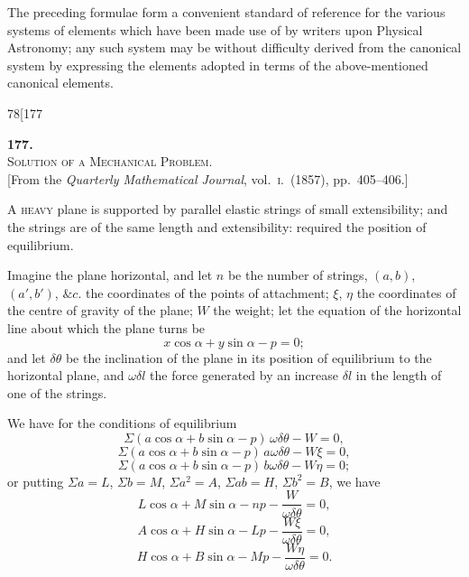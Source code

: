 \documentclass[11pt]{article}
\begin{document}
The preceding formulae form a convenient standard of reference for the various
systems of elements which have been made use of by writers upon Physical Astronomy;
any such system may be without difficulty derived from the canonical system by
expressing the elements adopted in terms of the above-mentioned canonical elements.

\newpage

\begin{center}
\small\textsc{78}\hfill\hfill[177
\end{center}

\vspace{4em}

\begin{center}
{\large\textbf{177.}}\\[1em]
{\large\scshape Solution of a Mechanical Problem.}\\[1em]
{\small [From the \textit{Quarterly Mathematical Journal}, vol.~\textsc{i}.\ (1857), pp.~405--406.]}
\end{center}

\bigskip

\textsc{A heavy} plane is supported by parallel elastic strings of small extensibility;
and the strings are of the same length and extensibility: required the position of
equilibrium.

Imagine the plane horizontal, and let $n$ be the number of strings, $(a, b)$, $(a', b')$,
$\&c.$ the coordinates of the points of attachment; $\xi$, $\eta$ the coordinates of the centre
of gravity of the plane; $W$ the weight; let the equation of the horizontal line about
which the plane turns be
\[
x\cos\alpha + y\sin\alpha - p = 0;
\]
and let $\delta\theta$ be the inclination of the plane in its position of equilibrium to the hori\-zontal plane, and $\omega\delta l$ the force generated by an increase $\delta l$ in the length of one of
the strings.

We have for the conditions of equilibrium
\[
\Sigma(a\cos\alpha + b\sin\alpha - p)\,\omega\delta\theta - W = 0,
\]
\[
\Sigma(a\cos\alpha + b\sin\alpha - p)\,a\omega\delta\theta - W\xi = 0,
\]
\[
\Sigma(a\cos\alpha + b\sin\alpha - p)\,b\omega\delta\theta - W\eta = 0;
\]
or putting $\Sigma a = L$, $\Sigma b = M$, $\Sigma a^{2} = A$, $\Sigma ab = H$, $\Sigma b^{2} = B$, we have
\[
L\cos\alpha + M\sin\alpha - np - \frac{W}{\omega\delta\theta} = 0,
\]
\[
A\cos\alpha + H\sin\alpha - Lp - \frac{W\xi}{\omega\delta\theta} = 0,
\]
\[
H\cos\alpha + B\sin\alpha - Mp - \frac{W\eta}{\omega\delta\theta} = 0.
\]
\end{document}
